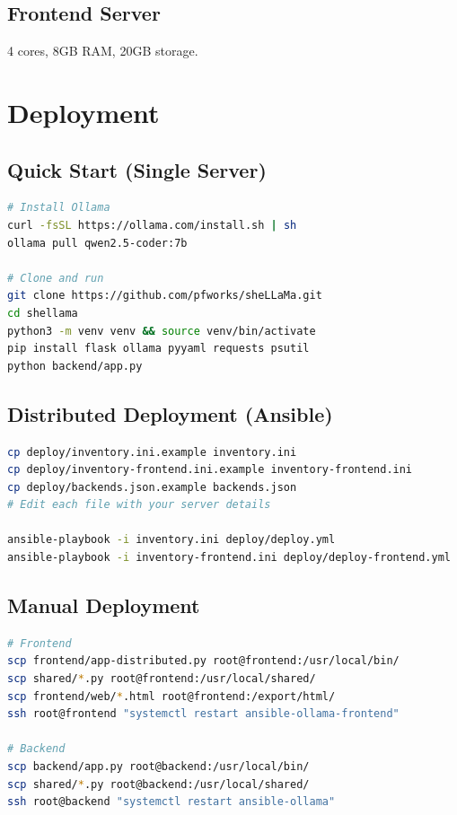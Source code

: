 \documentclass[11pt,a4paper]{article}
\begin{document}
\subsection{Frontend Server}
4 cores, 8GB RAM, 20GB storage.

\section{Deployment}

\subsection{Quick Start (Single Server)}
\begin{lstlisting}[language=bash]
# Install Ollama
curl -fsSL https://ollama.com/install.sh | sh
ollama pull qwen2.5-coder:7b

# Clone and run
git clone https://github.com/pfworks/sheLLaMa.git
cd shellama
python3 -m venv venv && source venv/bin/activate
pip install flask ollama pyyaml requests psutil
python backend/app.py
\end{lstlisting}

\subsection{Distributed Deployment (Ansible)}
\begin{lstlisting}[language=bash]
cp deploy/inventory.ini.example inventory.ini
cp deploy/inventory-frontend.ini.example inventory-frontend.ini
cp deploy/backends.json.example backends.json
# Edit each file with your server details

ansible-playbook -i inventory.ini deploy/deploy.yml
ansible-playbook -i inventory-frontend.ini deploy/deploy-frontend.yml
\end{lstlisting}

\subsection{Manual Deployment}
\begin{lstlisting}[language=bash]
# Frontend
scp frontend/app-distributed.py root@frontend:/usr/local/bin/
scp shared/*.py root@frontend:/usr/local/shared/
scp frontend/web/*.html root@frontend:/export/html/
ssh root@frontend "systemctl restart ansible-ollama-frontend"

# Backend
scp backend/app.py root@backend:/usr/local/bin/
scp shared/*.py root@backend:/usr/local/shared/
ssh root@backend "systemctl restart ansible-ollama"
\end{lstlisting}
\end{document}
